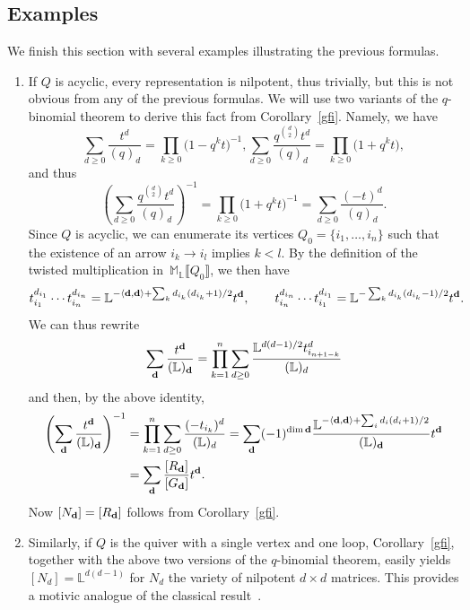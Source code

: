 \documentclass[pdftex]{sigma}
\numberwithin{equation}{section}
\theoremstyle{definition}
\begin{document}
\subsection{Examples}\label{ex part 1}

We finish this section with several examples illustrating the previous formulas.
\begin{enumerate}\itemsep=0pt
\item[(1)] If $Q$ is acyclic, every representation is nilpotent, thus
trivially, but this is not obvious from any of the previous formulas. We will use two variants of the $q$-binomial theorem to derive this fact from Corollary~\ref{gfi}. Namely, we have
\[\sum_{d\geq 0}\frac{t^d}{(q)_d}=\prod_{k\geq 0}\bigl(1-q^kt\bigr)^{-1}, \sum_{d\geq 0}\frac{q^{d\choose 2}t^d}{(q)_d}=\prod_{k\geq 0}\bigl(1+q^kt\bigr),\]
and thus
\[\left(\sum_{d\geq 0}\frac{q^{d\choose 2}t^d}{(q)_d}\right)^{-1}=\prod_{k\geq 0}\bigl(1+q^kt\bigr)^{-1}=\sum_{d\geq 0}\frac{(-t)^d}{(q)_d}.\]
Since $Q$ is acyclic, we can enumerate its vertices $Q_0=\{i_1,\dots,i_n\}$ such that the existence of an arrow $i_k\rightarrow i_l$ implies $k<l$. By the definition of the twisted multiplication in~$\mathbb{M}_\mathbb{L}\llbracket Q_0\rrbracket$, we then have
\[t_{i_1}^{d_{i_1}}\cdots t_{i_n}^{d_{i_n}}=\mathbb{L}^{-\langle{\bf d},{\bf d}\rangle+\sum_kd_{i_k}(d_{i_k}+1)/2}t^{\bf d},\qquad t_{i_n}^{d_{i_n}}\cdots t_{i_1}^{d_{i_1}}=\mathbb{L}^{-\sum_kd_{i_k}(d_{i_k}-1)/2}t^{\bf d}.\]
We can thus rewrite
\[\sum_{\bf d}\frac{t^{\bf d}}{(\mathbb{L})_{\bf d}}=\prod_{k=1}^n\sum_{d\geq 0}\frac{\mathbb{L}^{d(d-1)/2}t_{i_{n+1-k}}^d}{(\mathbb{L})_d}\]
and then, by the above identity,
\begin{align*}
\left(\sum_{\bf d}\frac{t^{\bf d}}{(\mathbb{L})_{\bf d}}\right)^{-1}&=\prod_{k=1}^n\sum_{d\geq 0}\frac{(-t_{i_k})^d}{(\mathbb{L})_d}
=\sum_{\bf d}(-1)^{\dim{\bf d}}\frac{\mathbb{L}^{-\langle{\bf d},{\bf d}\rangle+\sum_id_i(d_i+1)/2}}{(\mathbb{L})_{\bf d}}t^{\bf d}\\
&=\sum_{\bf d}\frac{[R_{\bf d}]}{[G_{\bf d}]}t^{\bf d}.\end{align*}
Now $[N_{\bf d}]=[R_{\bf d}]$ follows from Corollary~\ref{gfi}.
\item[(2)] Similarly, if $Q$ is the quiver with a single vertex and one loop, Corollary~\ref{gfi}, together with the above two versions of the $q$-binomial theorem, easily yields
$[N_d]=\mathbb{L}^{d(d-1)}$
for $N_d$ the variety of nilpotent $d\times d$ matrices. This provides a motivic analogue of the classical result~\cite{FH}.

\end{enumerate}
\end{document}
